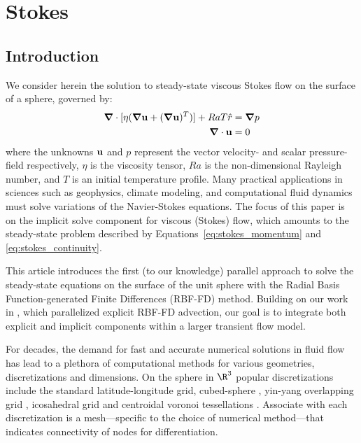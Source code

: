 
\chapter{Stokes}

\section{Introduction}

We consider herein the solution to steady-state viscous Stokes flow on the surface of a sphere, governed by: 
	\begin{align}
\mbox{\boldmath$ \nabla $} \cdot [\eta(\mbox{\boldmath$ \nabla $} \mathbf{u} + (\mbox{\boldmath$ \nabla $} \mathbf{u})^T)] + Ra T \hat{r} & = \mbox{\boldmath$ \nabla $} p \label{eq:stokes_momentum} \\
\mbox{\boldmath$ \nabla $} \cdot \mathbf{u} & = 0 \label{eq:stokes_continuity} 
\end{align}
where the unknowns $\mathbf{u}$ and $p$ represent the vector velocity- and scalar pressure-field respectively, $\eta$ is the viscosity tensor, $Ra$ is the non-dimensional Rayleigh number, and $T$ is an initial temperature profile. Many practical applications in sciences such as geophysics, climate modeling, and computational fluid dynamics must solve variations of the Navier-Stokes equations. The focus of this paper is on the implicit solve component for viscous (Stokes) flow, which amounts to the steady-state problem described by Equations~\ref{eq:stokes_momentum} and \ref{eq:stokes_continuity}. 

This article introduces the first (to our knowledge) parallel approach to solve the steady-state equations on the surface of the unit sphere with the Radial Basis Function-generated Finite Differences (RBF-FD) method. Building on our work in \cite{bolligFlyerErlebacher2011}, which parallelized explicit RBF-FD advection, our goal is to integrate both explicit and implicit components within a larger transient flow model. 





For decades, the demand for fast and accurate numerical solutions in fluid flow has lead to a plethora of computational methods for various geometries, discretizations and dimensions.  On the sphere in $\R^3$ popular discretizations include the standard latitude-longitude grid, cubed-sphere \cite{NairTransport05}, yin-yang overlapping grid \cite{Kameyama2008a}, icosahedral grid \cite{Randall2002} and centroidal voronoi tessellations \cite{Du2006}. Associate with each discretization is a mesh---specific to the choice of numerical method---that indicates connectivity of nodes for differentiation.

